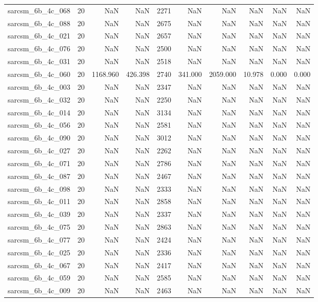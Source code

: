 \begin{tabular}{lrrrrrrrrr}
sarcsm\_6b\_4c\_068 & 20 & NaN & NaN & 2271 & NaN & NaN & NaN & NaN & NaN \\
sarcsm\_6b\_4c\_088 & 20 & NaN & NaN & 2675 & NaN & NaN & NaN & NaN & NaN \\
sarcsm\_6b\_4c\_021 & 20 & NaN & NaN & 2657 & NaN & NaN & NaN & NaN & NaN \\
sarcsm\_6b\_4c\_076 & 20 & NaN & NaN & 2500 & NaN & NaN & NaN & NaN & NaN \\
sarcsm\_6b\_4c\_031 & 20 & NaN & NaN & 2518 & NaN & NaN & NaN & NaN & NaN \\
sarcsm\_6b\_4c\_060 & 20 & 1168.960 & 426.398 & 2740 & 341.000 & 2059.000 & 10.978 & 0.000 & 0.000 \\
sarcsm\_6b\_4c\_003 & 20 & NaN & NaN & 2347 & NaN & NaN & NaN & NaN & NaN \\
sarcsm\_6b\_4c\_032 & 20 & NaN & NaN & 2250 & NaN & NaN & NaN & NaN & NaN \\
sarcsm\_6b\_4c\_014 & 20 & NaN & NaN & 3134 & NaN & NaN & NaN & NaN & NaN \\
sarcsm\_6b\_4c\_056 & 20 & NaN & NaN & 2581 & NaN & NaN & NaN & NaN & NaN \\
sarcsm\_6b\_4c\_090 & 20 & NaN & NaN & 3012 & NaN & NaN & NaN & NaN & NaN \\
sarcsm\_6b\_4c\_027 & 20 & NaN & NaN & 2262 & NaN & NaN & NaN & NaN & NaN \\
sarcsm\_6b\_4c\_071 & 20 & NaN & NaN & 2786 & NaN & NaN & NaN & NaN & NaN \\
sarcsm\_6b\_4c\_087 & 20 & NaN & NaN & 2467 & NaN & NaN & NaN & NaN & NaN \\
sarcsm\_6b\_4c\_098 & 20 & NaN & NaN & 2333 & NaN & NaN & NaN & NaN & NaN \\
sarcsm\_6b\_4c\_011 & 20 & NaN & NaN & 2858 & NaN & NaN & NaN & NaN & NaN \\
sarcsm\_6b\_4c\_039 & 20 & NaN & NaN & 2337 & NaN & NaN & NaN & NaN & NaN \\
sarcsm\_6b\_4c\_075 & 20 & NaN & NaN & 2863 & NaN & NaN & NaN & NaN & NaN \\
sarcsm\_6b\_4c\_077 & 20 & NaN & NaN & 2424 & NaN & NaN & NaN & NaN & NaN \\
sarcsm\_6b\_4c\_025 & 20 & NaN & NaN & 2336 & NaN & NaN & NaN & NaN & NaN \\
sarcsm\_6b\_4c\_067 & 20 & NaN & NaN & 2417 & NaN & NaN & NaN & NaN & NaN \\
sarcsm\_6b\_4c\_059 & 20 & NaN & NaN & 2585 & NaN & NaN & NaN & NaN & NaN \\
sarcsm\_6b\_4c\_009 & 20 & NaN & NaN & 2463 & NaN & NaN & NaN & NaN & NaN \\

\end{tabular}
